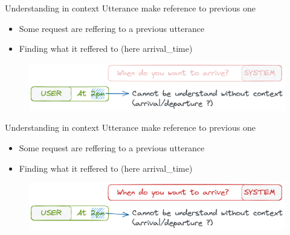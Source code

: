 \documentclass[10pt,aspectratio=169]{beamer}
\begin{document}
\begin{frame}
    \begin{block}{Understanding in context}
        Utterance make reference to previous one
        \begin{itemize}
            \item Some request are reffering to a previous utterance
            \item Finding what it reffered to (here arrival\_time)
        \end{itemize}
    \end{block}
    \begin{figure}[b]
        \centering
        \includegraphics[width=.9\textwidth]{media/in_context_when_0.png}
        \label{fig:my_label}
    \end{figure}
\end{frame}
\begin{frame}[noframenumbering]
    \begin{block}{Understanding in context}
        Utterance make reference to previous one
        \begin{itemize}
            \item Some request are reffering to a previous utterance
            \item Finding what it reffered to (here arrival\_time)
        \end{itemize}
    \end{block}
    \begin{figure}[b]
        \centering
        \includegraphics[width=.9\textwidth]{media/in_context_when.png}
        \label{fig:my_label}
    \end{figure}
    
\end{frame}
\end{document}

